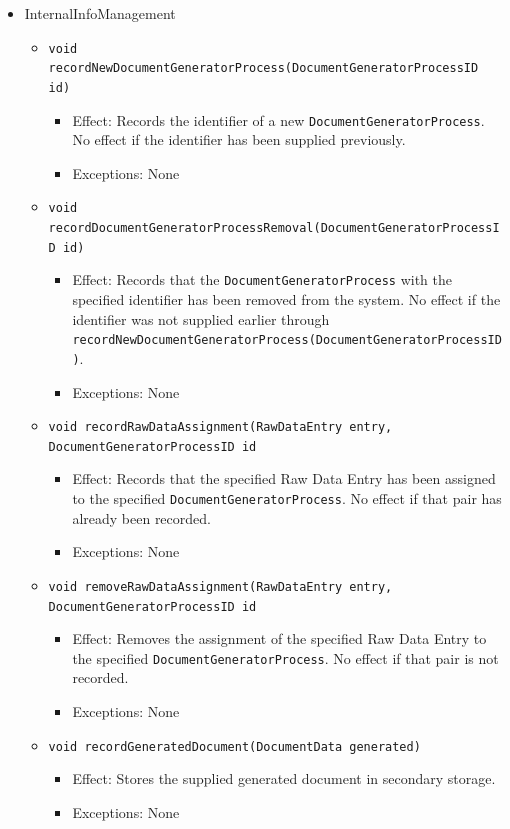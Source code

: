 \documentclass[a4paper,10pt]{article}
\begin{document}
\begin{itemize}
	\item InternalInfoManagement
	\begin{itemize}
		\item \texttt{void recordNewDocumentGeneratorProcess(DocumentGeneratorProcessID id)}
		\begin{itemize}
			\item Effect: Records the identifier of a new \texttt{DocumentGeneratorProcess}. No effect if the identifier has been supplied previously.
			\item Exceptions: None
		\end{itemize}
		
		\item \texttt{void recordDocumentGeneratorProcessRemoval(DocumentGeneratorProcessID id)}
		\begin{itemize}
			\item Effect: Records that the \texttt{DocumentGeneratorProcess} with the specified identifier has been removed from the system. No effect if the identifier was not supplied earlier through \texttt{recordNewDocumentGeneratorProcess(DocumentGeneratorProcessID)}.
			\item Exceptions: None
		\end{itemize}
		
		\item \texttt{void recordRawDataAssignment(RawDataEntry entry, DocumentGeneratorProcessID id}
		\begin{itemize}
			\item Effect: Records that the specified Raw Data Entry has been assigned to the specified \texttt{DocumentGeneratorProcess}. No effect if that pair has already been recorded.
			\item Exceptions: None
		\end{itemize}
		
		\item \texttt{void removeRawDataAssignment(RawDataEntry entry, DocumentGeneratorProcessID id}
		\begin{itemize}
			\item Effect: Removes the assignment of the specified Raw Data Entry to the specified \texttt{DocumentGeneratorProcess}. No effect if that pair is not recorded.
			\item Exceptions: None
		\end{itemize}
		
		\item \texttt{void recordGeneratedDocument(DocumentData generated)}
		\begin{itemize}
			\item Effect: Stores the supplied generated document in secondary storage.
			\item Exceptions: None
		\end{itemize}
		

\end{itemize}
\end{itemize}
\end{document}
